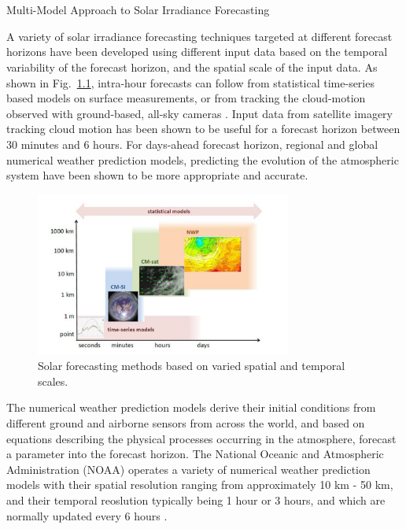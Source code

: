 \chapter{}{Multi-Model Approach to Solar Irradiance Forecasting}

A variety of solar irradiance forecasting techniques targeted at different forecast horizons have been developed using different input data based on the temporal variability of the forecast horizon, and the spatial scale of the input data. As shown in Fig.~\ref{fig:fig_variability}, intra-hour forecasts can follow from statistical time-series based models on surface measurements, or from tracking the cloud-motion observed with ground-based, all-sky cameras \cite{multimodel_intrahour}. Input data from satellite imagery tracking cloud motion has been shown to be useful for a forecast horizon between 30 minutes and 6 hours. For days-ahead forecast horizon, regional and global numerical weather prediction models, predicting the evolution of the atmospheric system have been shown to be more appropriate and accurate.

\begin{figure}[htbp]
    \begin{center}
    	\includegraphics[width=0.75\textwidth]{chapter3/fig_variability.png}
    	\caption[Solar forecasting methods based on varied spatial and temporal scales]{Solar forecasting methods based on varied spatial and temporal scales\cite{multimodel_figure1}.}
    	\label{fig:fig_variability}
    \end{center}
\end{figure}

\restoregeometry

\par The numerical weather prediction models derive their initial conditions from different ground and airborne sensors from across the world, and based on equations describing the physical processes occurring in the atmosphere, forecast a parameter into the forecast horizon. The National Oceanic and Atmospheric Administration (NOAA) operates a variety of numerical weather prediction models with their spatial resolution ranging from approximately 10 km - 50 km, and their temporal reoslution typically being 1 hour or 3 hours, and which are normally updated every 6 hours \cite{multimodel_bestpractices}. 

